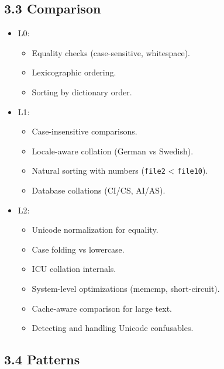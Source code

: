 \documentclass[
  letterpaper,
  DIV=11,
  numbers=noendperiod]{scrreprt}
\providecommand{\tightlist}{%
  \setlength{\itemsep}{0pt}\setlength{\parskip}{0pt}}
\begin{document}
\subsection{3.3 Comparison}\label{comparison-1}

\begin{itemize}
\item
  L0:

  \begin{itemize}
  \tightlist
  \item
    Equality checks (case-sensitive, whitespace).
  \item
    Lexicographic ordering.
  \item
    Sorting by dictionary order.
  \end{itemize}
\item
  L1:

  \begin{itemize}
  \tightlist
  \item
    Case-insensitive comparisons.
  \item
    Locale-aware collation (German vs Swedish).
  \item
    Natural sorting with numbers (\texttt{file2} \textless{}
    \texttt{file10}).
  \item
    Database collations (CI/CS, AI/AS).
  \end{itemize}
\item
  L2:

  \begin{itemize}
  \tightlist
  \item
    Unicode normalization for equality.
  \item
    Case folding vs lowercase.
  \item
    ICU collation internals.
  \item
    System-level optimizations (memcmp, short-circuit).
  \item
    Cache-aware comparison for large text.
  \item
    Detecting and handling Unicode confusables.
  \end{itemize}
\end{itemize}

\subsection{3.4 Patterns}\label{patterns-1}
\end{document}
